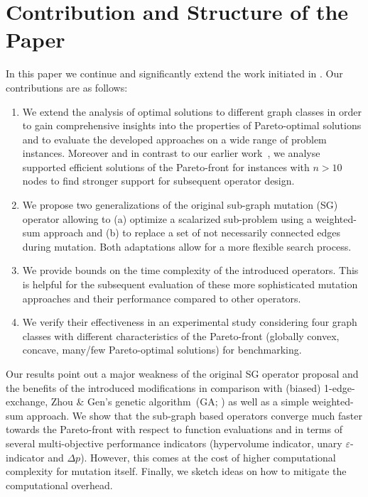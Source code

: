 \documentclass[twoside]{article}
\begin{document}

\section{Contribution and Structure of the Paper}
\label{sec:structure}
%
In this paper we continue and significantly extend the work initiated in \cite{BG2017ParetoBeneficial}. Our contributions are as follows: 
\begin{enumerate}
    \item We extend the analysis of optimal solutions to different graph classes in order to gain comprehensive insights into the properties of Pareto-optimal solutions and to evaluate the developed approaches on a wide range of problem instances. Moreover and in contrast to our earlier work~\citep{BG2017ParetoBeneficial}, we analyse supported efficient solutions of the Pareto-front for instances with $n > 10$ nodes to find stronger support for subsequent operator design. 
    \item We propose two generalizations of the original sub-graph mutation (SG) operator allowing to (a) optimize a scalarized sub-problem using a weighted-sum approach and (b) to replace a set of not necessarily connected edges during mutation. Both adaptations allow for a more flexible search process.
    \item We provide bounds on the time complexity of the introduced operators.
    This is helpful for the subsequent evaluation of these more sophisticated mutation approaches and their performance compared to other operators.
    \item We verify their effectiveness in an experimental study considering four graph classes with different characteristics of the Pareto-front (globally convex, concave, many/few Pareto-optimal solutions) for benchmarking.
\end{enumerate}
 
 Our results point out a major weakness of the original SG operator proposal and the benefits of the introduced modifications in comparison with (biased) 1-edge-exchange, Zhou \& Gen's genetic algorithm~(GA; \citet{ZG99}) as well as a simple weighted-sum approach. We show that the sub-graph based operators converge much faster towards the Pareto-front with respect to function evaluations and in terms of several multi-objective performance indicators (hypervolume indicator, unary $\varepsilon$-indicator and $\Delta p$). However, this comes at the cost of higher computational complexity for mutation itself. Finally, we sketch ideas on how to mitigate the computational overhead. 
 
\end{document}
